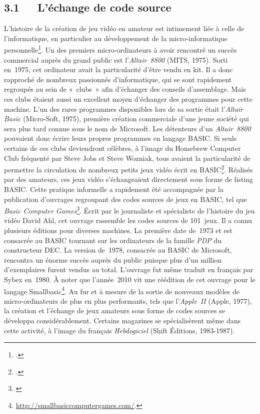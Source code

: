 \documentclass{FramateX}
\begin{document}
\begin{refsection}
\subsection*{3.1~~~L'échange de code source}
{}

L'histoire de la création de jeu vidéo en amateur est intimement liée à
celle de l'informatique, en particulier au développement de la
micro-informatique personnelle\footnote{\cite{chaplinsmartbomb2005}.}. Un des premiers
micro-ordinateurs à avoir rencontré un succès commercial auprès du
grand public est l'\textit{Altair~8800} (MITS, 1975). Sorti en~1975, cet ordinateur avait la particularité
d'être vendu en kit. Il a donc rapproché de nombreux passionnés
d'informatique, qui se sont rapidement regroupés au sein de «~clubs~»
afin d'échanger des conseils d'assemblage. Mais ces clubs étaient aussi
un excellent moyen d'échanger des programmes pour cette
machine. L'un des rares programmes
disponibles lors de sa sortie était
l'\textit{Altair Basic} (Micro-Soft, 1975),
première création commerciale d'une jeune société qui sera plus tard
connue sous le nom de Microsoft. Les
détenteurs d'un \textit{Altair~8800} pouvaient donc écrire leurs propres programmes en langage BASIC. Si
seuls certains de ces clubs deviendront célèbres, à l'image du Homebrew Computer Club fréquenté par
Steve Jobs et Steve Wozniak, tous avaient la particularité de permettre
la circulation de nombreux petits jeux vidéo écrit en BASIC\footnote{\cite{wolfvideo2007}.}. Réalisés par des amateurs, ces jeux vidéo s'échangeaient
directement sous forme de listing BASIC. Cette pratique informelle a
rapidement été accompagnée par la publication d'ouvrages regroupant des
codes sources de jeux en BASIC, tel que
\textit{Basic Computer Games}\footnote{\cite{ahlbasic1978}}. 
Écrit par le journaliste et spécialiste de l'histoire du jeu vidéo
David Ahl, cet ouvrage rassemble les codes sources de 101~jeux. Il a
connu plusieurs éditions pour diverses machines. La première date
de~1973 et est consacrée au BASIC tournant sur les ordinateurs de la
famille \textit{PDP} du constructeur DEC. La version de~1978, consacrée
au BASIC de Microsoft, rencontra un
énorme succès auprès du public puisque plus d'un million d'exemplaires
furent vendus au total. L'ouvrage fut même traduit en français par Sybex en~1980. À noter que
l'année~2010 vit une réédition de cet ouvrage pour le langage
Smallbasic\footnote{\url{http://smallbasiccomputergames.com/}.}. Au fur et à mesure de la sortie de nouveaux modèles de
micro-ordinateurs de plus en plus performants, tels que
l'\textit{Apple~II} (Apple, 1977), la
création et l'échange de jeux amateurs sous forme de codes sources se
développa considérablement. Certains magazines se spécialisèrent même
dans cette activité, à l'image du français
\textit{Hebdogiciel} (Shift Éditions, 1983-1987). 



\end{refsection}
\end{document}
